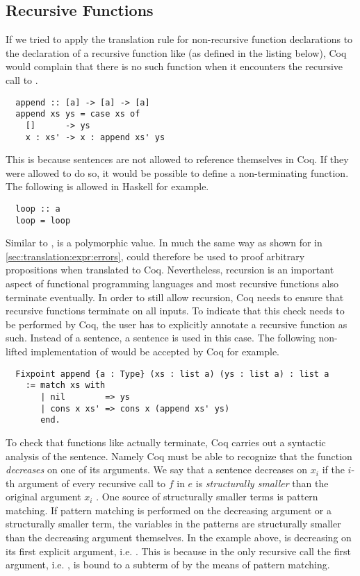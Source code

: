 \subsection{Recursive Functions}
If we tried to apply the translation rule for non-recursive function declarations to the declaration of a recursive function like  (as defined in the listing below), Coq would complain that there is no such function when it encounters the recursive call to .
\begin{verbatim}
  append :: [a] -> [a] -> [a]
  append xs ys = case xs of
    []      -> ys
    x : xs' -> x : append xs' ys
\end{verbatim}
This is because  sentences are not allowed to reference themselves in Coq.
If they were allowed to do so, it would be possible to define a non-terminating function.
The following is allowed in Haskell for example.
\begin{verbatim}
  loop :: a
  loop = loop
\end{verbatim}
Similar to ,  is a polymorphic value.
In much the same way as shown for  in \autoref{sec:translation:expr:errors},  could therefore be used to proof arbitrary propositions when translated to Coq.
Nevertheless, recursion is an important aspect of functional programming languages and most recursive functions also terminate eventually.
In order to still allow recursion, Coq needs to ensure that recursive functions terminate on all inputs.
To indicate that this check needs to be performed by Coq, the user has to explicitly annotate a recursive function as such.
Instead of a  sentence, a  sentence is used in this case.
The following non-lifted implementation of  would be accepted by Coq for example.
\begin{verbatim}
  Fixpoint append {a : Type} (xs : list a) (ys : list a) : list a
    := match xs with
       | nil        => ys
       | cons x xs' => cons x (append xs' ys)
       end.
\end{verbatim}
To check that functions like  actually terminate, Coq carries out a syntactic analysis of the  sentence.
Namely Coq must be able to recognize that the function \textit{decreases} on one of its arguments.
We say that a  sentence  decreases on $x_i$ if the $i$-th argument of every recursive call to $f$ in $e$ is \textit{structurally smaller} than the original argument $x_i$ \cite[p.~111]{CoqDevTeam:2018}.
One source of structurally smaller terms is pattern matching.
If pattern matching is performed on the decreasing argument or a structurally smaller term, the variables in the patterns are structurally smaller than the decreasing argument themselves.
In the example above,  is decreasing on its first explicit argument, i.e. .
This is because in the only recursive call  the first argument, i.e. , is bound to a subterm of  by the means of pattern matching.

